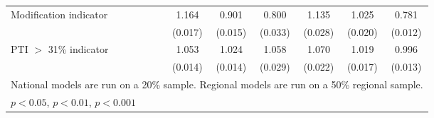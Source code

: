 {\begin{tabular}{l*{10}{c}}
Modification indicator&                     &                     &                     &                     &       1.164\sym{***}&       0.901\sym{***}&       0.800\sym{***}&       1.135\sym{***}&       1.025         &       0.781\sym{***}\\
                    &                     &                     &                     &                     &     (0.017)         &     (0.015)         &     (0.033)         &     (0.028)         &     (0.020)         &     (0.012)         \\
PTI $>$ 31\% indicator&                     &                     &                     &                     &       1.053\sym{***}&       1.024         &       1.058\sym{*}  &       1.070\sym{**} &       1.019         &       0.996         \\
                    &                     &                     &                     &                     &     (0.014)         &     (0.014)         &     (0.029)         &     (0.022)         &     (0.017)         &     (0.013)         \\
\hline\hline
\multicolumn{11}{l}{\footnotesize National models are run on a 20\% sample.  Regional models are run on a 50\% regional sample.}\\
\multicolumn{11}{l}{\footnotesize \sym{*} \(p<0.05\), \sym{**} \(p<0.01\), \sym{***} \(p<0.001\)}\\
\end{tabular}
}
